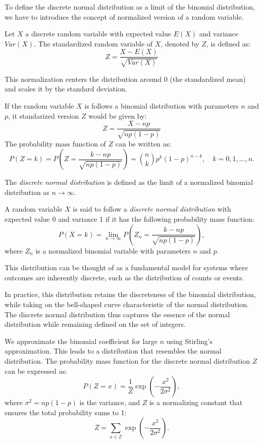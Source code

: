 To define the discrete normal distribution as a limit of the binomial distribution, we have to introduce the concept of normalized version of a random variable.

\begin{definition}
Let $X$ a discrete random variable with expected value $E(X)$ and variance $Var(X)$. The standardized random variable of $X$, denoted by $Z$, is defined as:
\[
Z = \frac{X - E(X)}{\sqrt{Var(X)}}
\]
\end{definition}

This normalization centers the distribution around 0 (the standardized mean) and scales it by the standard deviation. 

\begin{example}
If the random variable $X$ is follows a binomial distribution with parameters $n$ and $p$, it standarized version $Z$ would be given by:
\[
Z = \frac{X - np}{\sqrt{np(1-p)}}
\]
The probability mass function of $Z$ can be written as:
\[
P\left(Z = k\right) = P\left( Z = \frac{k - np}{\sqrt{np(1-p)}} \right) = \binom{n}{k} p^k (1-p)^{n-k}, \quad k = 0, 1, \dots, n.
\]
\end{example}

The \textit{discrete normal distribution} is defined as the limit of a normalized binomial distribution as $n \to \infty$.

\begin{definition}
A random variable $X$ is said to follow a \emph{discrete normal distribution} with expected value 0 and variance 1 if it has the following probability mass function:
\[
P(X = k) = \lim_{n \to \infty} P\left( Z_n = \frac{k - np}{\sqrt{np(1-p)}} \right),
\]
where $Z_n$ is a normalized binomial variable with parameters $n$ and $p$.
\end{definition}

This distribution can be thought of as a fundamental model for systems where outcomes are inherently discrete, such as the distribution of counts or events.

In practice, this distribution retains the discreteness of the binomial distribution, while taking on the bell-shaped curve characteristic of the normal distribution. The discrete normal distribution thus captures the essence of the normal distribution while remaining defined on the set of integers.

We approximate the binomial coefficient for large \( n \) using Stirling's approximation. This leads to a distribution that resembles the normal distribution. The probability mass function for the discrete normal distribution \( Z \) can be expressed as:
\[
P(Z = x) = \frac{1}{Z} \exp\left(-\frac{x^2}{2\sigma^2}\right),
\]
where \( \sigma^2 = np(1-p) \) is the variance, and \( Z \) is a normalizing constant that ensures the total probability sums to 1:
\[
Z = \sum_{x \in \mathbb{Z}} \exp\left(-\frac{x^2}{2\sigma^2}\right).
\]

